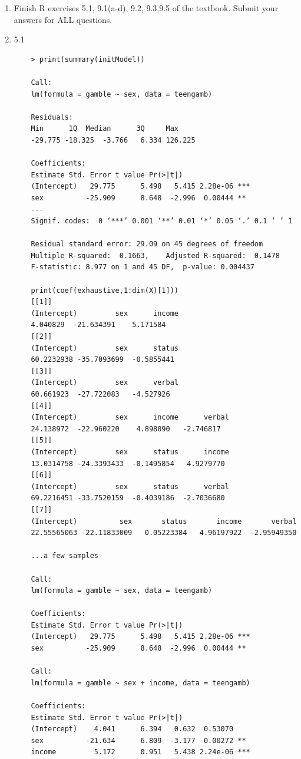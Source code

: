 \documentclass[11pt]{article}
\begin{document}
\begin{enumerate}
\item  Finish R exercises 5.1, 9.1(a-d), 9.2, 9.3,9.5 of the textbook. Submit your
answers for {\color{red}ALL} questions.\\
\item 5.1
\begin{verbatim}
	> print(summary(initModel))
	
	Call:
	lm(formula = gamble ~ sex, data = teengamb)
	
	Residuals:
	Min      1Q  Median      3Q     Max 
	-29.775 -18.325  -3.766   6.334 126.225 
	
	Coefficients:
	Estimate Std. Error t value Pr(>|t|)    
	(Intercept)   29.775      5.498   5.415 2.28e-06 ***
	sex          -25.909      8.648  -2.996  0.00444 ** 
	---
	Signif. codes:  0 ‘***’ 0.001 ‘**’ 0.01 ‘*’ 0.05 ‘.’ 0.1 ‘ ’ 1
	
	Residual standard error: 29.09 on 45 degrees of freedom
	Multiple R-squared:  0.1663,	Adjusted R-squared:  0.1478 
	F-statistic: 8.977 on 1 and 45 DF,  p-value: 0.004437
	
	print(coef(exhaustive,1:dim(X)[1]))
	[[1]]
	(Intercept)         sex      income 
	4.040829  -21.634391    5.171584 
	[[2]]
	(Intercept)         sex      status 
	60.2232938 -35.7093699  -0.5855441 
	[[3]]
	(Intercept)         sex      verbal 
	60.661923  -27.722083   -4.527926 
	[[4]]
	(Intercept)         sex      income      verbal 
	24.138972  -22.960220    4.898090   -2.746817 
	[[5]]
	(Intercept)         sex      status      income 
	13.0314758 -24.3393433  -0.1495854   4.9279770 
	[[6]]
	(Intercept)         sex      status      verbal 
	69.2216451 -33.7520159  -0.4039186  -2.7036680 
	[[7]]
	(Intercept)          sex       status       income       verbal 
	22.55565063 -22.11833009   0.05223384   4.96197922  -2.95949350 
	
	...a few samples

	Call:
	lm(formula = gamble ~ sex, data = teengamb)
	
	Coefficients:
	Estimate Std. Error t value Pr(>|t|)    
	(Intercept)   29.775      5.498   5.415 2.28e-06 ***
	sex          -25.909      8.648  -2.996  0.00444 ** 

	Call:
	lm(formula = gamble ~ sex + income, data = teengamb)

	Coefficients:
	Estimate Std. Error t value Pr(>|t|)    
	(Intercept)    4.041      6.394   0.632  0.53070    
	sex          -21.634      6.809  -3.177  0.00272 ** 
	income         5.172      0.951   5.438 2.24e-06 ***


\end{verbatim}
\end{enumerate}
\end{document}
